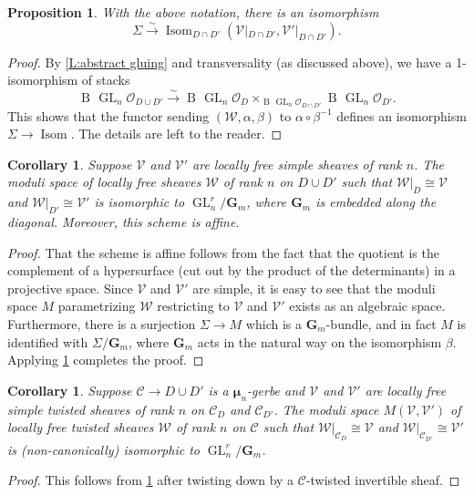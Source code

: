 \documentclass[11pt]{amsart}
\newcommand{\field}[1]{\mathbf #1}
\newcommand{\ms}[1]{\mathscr #1}
\newcommand{\simto}{\stackrel{\sim}{\to}}
\newcommand{\m}{\boldsymbol{\mu}}
\newcommand{\G}{\field G} %
\newcommand{\GL}{\operatorname{GL}}
\renewcommand{\[}{[\!\hspace{0.03em}[}
\renewcommand{\]}{]\!\hspace{0.03em}]}
\renewcommand{\(}{(\!\hspace{0.03em}(}
\renewcommand{\)}{)\!\hspace{0.03em})}
\DeclareMathOperator{\isom}{\operatorname{Isom}}
\DeclareMathOperator{\B}{\operatorname{B\!}}
\newtheorem{prop}[lem]{Proposition}
\newtheorem{cor}[lem]{Corollary}
\theoremstyle{definition}
\theoremstyle{remark}
\begin{document}
\begin{prop}\label{P:sheafified gluing} With the above notation, there 
is an isomorphism 
$$\Sigma\simto\isom_{D\cap D'}(\ms 
V|_{D\cap D'},\ms V'|_{D\cap D'}).$$
\end{prop}
\begin{proof} By \ref{L:abstract gluing} and transversality (as 
discussed above), we have a 1-isomorphism of stacks
$$\B{\GL_{n}{\ms O}_{D\cup 
D'}}\simto\B{\GL_{n}{\ms O}_{D}}\times_{\B{\GL_{n}{\ms O}_{D\cap D'}}}\B{\GL_{n}{\ms O}_{D'}}.$$
This shows that the functor sending $(\ms W,\alpha,\beta)$ to 
$\alpha\circ\beta^{-1}$ defines an isomorphism $\Sigma\to\isom$.  The 
details are left to the reader.
\end{proof}
\begin{cor}\label{C:untwisted gluing} Suppose $\ms V$ and $\ms V'$ are locally free simple sheaves 
of rank $n$.  The moduli space of locally free sheaves $\ms W$ of rank $n$ on 
$D\cup D'$ such that $\ms W|_{D}\cong\ms V$ and $\ms W|_{D'}\cong\ms 
V'$ is isomorphic to $\GL_{n}^{r}/\G_{m}$, where $\G_{m}$ is embedded 
along the diagonal.  Moreover, this scheme is affine.
\end{cor}
\begin{proof} That the scheme is affine follows from the fact that the 
quotient is the complement of a hypersurface (cut out by the product of 
the determinants) in a projective space.  Since $\ms V$ and $\ms V'$ 
are simple, it is easy to see that the moduli space $M$ parametrizing $\ms W$ 
restricting to $\ms V$ and $\ms V'$ exists as an algebraic space.  
Furthermore, there is a surjection $\Sigma\to M$ which is a 
$\G_{m}$-bundle, and in fact $M$ is identified with 
$\Sigma/\G_{m}$, where $\G_{m}$ acts in the natural way on the 
isomorphism $\beta$.  Applying \ref{P:sheafified gluing} completes the 
proof.
\end{proof}
\begin{cor}\label{C:twisted gluing} Suppose $\ms C\to D\cup D'$ is 
a $\m_{n}$-gerbe and $\ms V$ and $\ms V'$ are locally free simple 
twisted sheaves of rank $n$ on $\ms C_{D}$ and $\ms C_{D'}$.  The 
moduli space $M(\ms V,\ms V')$ of locally free twisted sheaves $\ms W$ of rank $n$ on 
$\ms C$ such that $\ms W|_{\ms C_{D}}\cong\ms V$ and $\ms W|_{\ms 
C_{D'}}\cong\ms V'$ is (non-canonically) isomorphic to $\GL_{n}^{r}/\G_{m}$.
\end{cor}
\begin{proof} This follows from \ref{C:untwisted gluing} after 
twisting down by a $\ms C$-twisted invertible sheaf.
\end{proof}
\end{document}
